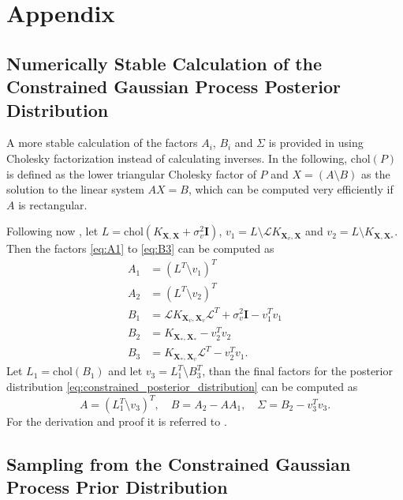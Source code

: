 \chapter{Appendix}

\section{Numerically Stable Calculation of the Constrained Gaussian Process Posterior Distribution}
\label{apx:numerically_stable_factors}

A more stable calculation of the factors $A_i$, $B_i$ and $\Sigma$ is provided in \cite[Lemma~2]{Agrell_2019} using Cholesky factorization instead of calculating inverses. In the following, $\mathrm{chol}(P)$ is defined as the lower triangular Cholesky factor of $P$ and $X = (A \setminus B)$ as the solution to the linear system $AX = B$, which can be computed very efficiently if $A$ is rectangular.

Following now \cite[Lemma~2]{Agrell_2019}, let $L = \mathrm{chol}(K_{\mathbf{X},\mathbf{X}} + \sigma_v^2\mathbf{I})$, $v_1 = L \setminus \mathcal{L}K_{\mathbf{X}_v,\mathbf{X}}$ and $v_2 = L \setminus K_{\mathbf{X},\mathbf{X}_*}$. Then the factors \eqref{eq:A1} to \eqref{eq:B3} can be computed as 
\begin{align}
    A_1 &= \left(L^T \setminus v_1\right)^T \\
    A_2 &= \left(L^T \setminus v_2\right)^T \\
    B_1 &= \mathcal{L}K_{\mathbf{X}_v,\mathbf{X}_v}\mathcal{L}^T + \sigma_v^2 \mathbf{I} - v_1^T v_1 \\
    B_2 &= K_{\mathbf{X}_*,\mathbf{X}_*} - v_2^T v_2 \\
    B_3 &= K_{\mathbf{X}_*,\mathbf{X}_v}\mathcal{L}^T - v_2^T v_1.
\end{align}
Let $L_1 = \mathrm{chol}(B_1)$ and let $v_3 = L_1^T \setminus B_3^T$, than the final factors for the posterior distribution \eqref{eq:constrained_posterior_distribution} can be computed as
\begin{equation}
    A = \left(L_1^T \setminus v_3\right)^T, \quad B = A_2 - A A_1, \quad \Sigma = B_2 - v_3^T v_3.
\end{equation}
For the derivation and proof it is referred to \cite[Appendix~B]{Agrell_2019}.

\section{Sampling from the Constrained Gaussian Process Prior Distribution}
\label{apx:sampling_from_prior}

